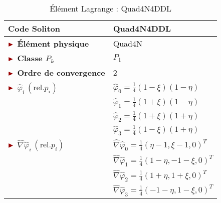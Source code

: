 \begin{table}[H]
\begin{minipage}[t]{0.48\linewidth}
\begin{tabular}{>{\bfseries} l|l}
			\toprule %
			\rowcolor{black!10}\rowstyle{\color{MyRed}\bfseries} Code Soliton & \textcolor{MyRed}{\textbf{Quad4N4DDL}}\\
			\midrule
			$\mytriangle$ Élément physique & \textcolor{MyRed}{Quad4N}\\
			$\mytriangle$ Classe $P_k$ & $P_1$\\
			$\mytriangle$ Ordre de convergence & 2\\
			\midrule
			$\mytriangle$ $\widehat{\varphi}_i\, (\text{rel.} p_i)$ &  $\widehat{\varphi}_0 = \frac{1}{4}(1-\xi)(1-\eta)$\\
			&  $\widehat{\varphi}_1 = \frac{1}{4}(1+\xi)(1-\eta)$\\
			&  $\widehat{\varphi}_2 = \frac{1}{4}(1+\xi)(1+\eta)$\\
			&  $\widehat{\varphi}_3 = \frac{1}{4}(1-\xi)(1+\eta)$\\
			\midrule
			$\mytriangle$ $\widehat{\nabla}\widehat{\varphi}_i\, (\text{rel.} p_i)$ & $\widehat{\nabla}\widehat{\varphi}_0 = \frac{1}{4}\left(\eta-1, \xi-1, 0\right)^T$ \\
			& $\widehat{\nabla}\widehat{\varphi}_1 = \frac{1}{4}\left(1-\eta, -1-\xi, 0\right)^T$ \\
			& $\widehat{\nabla}\widehat{\varphi}_2 = \frac{1}{4}\left(1+\eta, 1+\xi, 0\right)^T$ \\
			& $\widehat{\nabla}\widehat{\varphi}_3 = \frac{1}{4}\left(-1-\eta, 1-\xi, 0\right)^T$ \\
			\bottomrule %
		\end{tabular}
		\caption{Élément Lagrange : Quad4N4DDL}
		\label{tab:Quad4N4DDL}
	\end{minipage}\hfill
\end{table}

